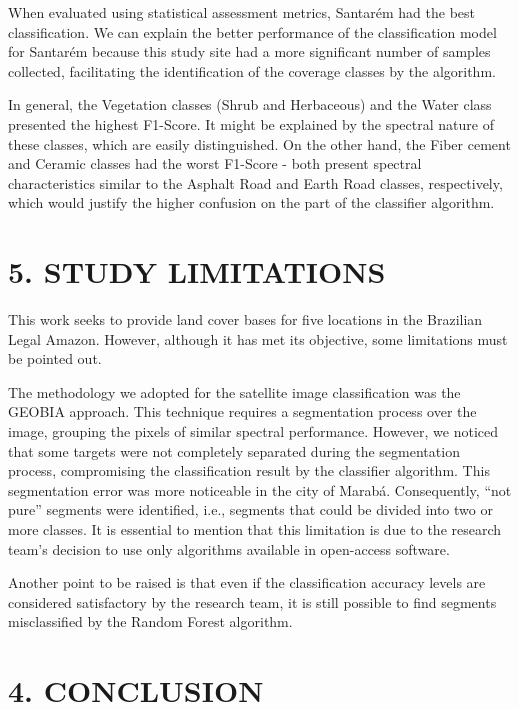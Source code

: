 \documentclass[preprint, 3p,
authoryear]{elsarticle} %
\begin{document}
When evaluated using statistical assessment metrics, Santarém had the
best classification. We can explain the better performance of the
classification model for Santarém because this study site had a more
significant number of samples collected, facilitating the identification
of the coverage classes by the algorithm.

In general, the Vegetation classes (Shrub and Herbaceous) and the Water
class presented the highest F1-Score. It might be explained by the
spectral nature of these classes, which are easily distinguished. On the
other hand, the Fiber cement and Ceramic classes had the worst F1-Score
- both present spectral characteristics similar to the Asphalt Road and
Earth Road classes, respectively, which would justify the higher
confusion on the part of the classifier algorithm.

\hypertarget{study-limitations}{%
\section{5. STUDY LIMITATIONS}\label{study-limitations}}

This work seeks to provide land cover bases for five locations in the
Brazilian Legal Amazon. However, although it has met its objective, some
limitations must be pointed out.

The methodology we adopted for the satellite image classification was
the GEOBIA approach. This technique requires a segmentation process over
the image, grouping the pixels of similar spectral performance. However,
we noticed that some targets were not completely separated during the
segmentation process, compromising the classification result by the
classifier algorithm. This segmentation error was more noticeable in the
city of Marabá. Consequently, ``not pure'' segments were identified,
i.e., segments that could be divided into two or more classes. It is
essential to mention that this limitation is due to the research team's
decision to use only algorithms available in open-access software.

Another point to be raised is that even if the classification accuracy
levels are considered satisfactory by the research team, it is still
possible to find segments misclassified by the Random Forest algorithm.

\hypertarget{conclusion}{%
\section{4. CONCLUSION}\label{conclusion}}
\end{document}
